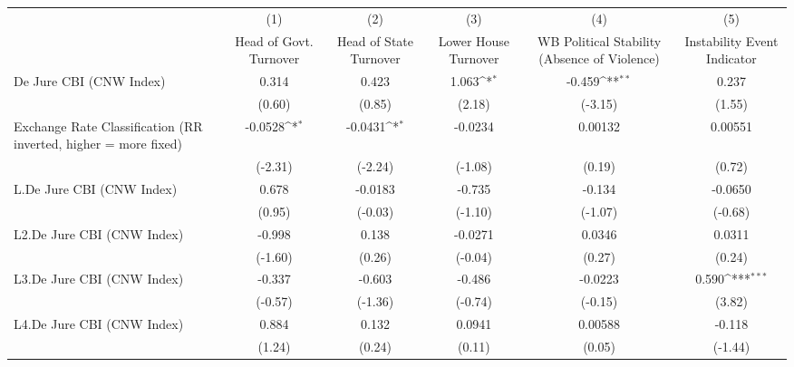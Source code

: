 {
\def\sym#1{\ifmmode^{#1}\else\(^{#1}\)\fi}
\begin{longtable}{l*{5}{c}}
\hline\hline\endfirsthead\hline\endhead\hline\endfoot\endlastfoot
                &\multicolumn{1}{c}{(1)}&\multicolumn{1}{c}{(2)}&\multicolumn{1}{c}{(3)}&\multicolumn{1}{c}{(4)}&\multicolumn{1}{c}{(5)}\\
                &\multicolumn{1}{c}{Head of Govt. Turnover}&\multicolumn{1}{c}{Head of State Turnover}&\multicolumn{1}{c}{Lower House Turnover}&\multicolumn{1}{c}{WB Political Stability (Absence of Violence)}&\multicolumn{1}{c}{Instability Event Indicator}\\
\hline
De Jure CBI (CNW Index)&    0.314         &    0.423         &    1.063\sym{*}  &   -0.459\sym{**} &    0.237         \\
                &   (0.60)         &   (0.85)         &   (2.18)         &  (-3.15)         &   (1.55)         \\
[1em]
Exchange Rate Classification (RR inverted, higher = more fixed)&  -0.0528\sym{*}  &  -0.0431\sym{*}  &  -0.0234         &  0.00132         &  0.00551         \\
                &  (-2.31)         &  (-2.24)         &  (-1.08)         &   (0.19)         &   (0.72)         \\
[1em]
L.De Jure CBI (CNW Index)&    0.678         &  -0.0183         &   -0.735         &   -0.134         &  -0.0650         \\
                &   (0.95)         &  (-0.03)         &  (-1.10)         &  (-1.07)         &  (-0.68)         \\
[1em]
L2.De Jure CBI (CNW Index)&   -0.998         &    0.138         &  -0.0271         &   0.0346         &   0.0311         \\
                &  (-1.60)         &   (0.26)         &  (-0.04)         &   (0.27)         &   (0.24)         \\
[1em]
L3.De Jure CBI (CNW Index)&   -0.337         &   -0.603         &   -0.486         &  -0.0223         &    0.590\sym{***}\\
                &  (-0.57)         &  (-1.36)         &  (-0.74)         &  (-0.15)         &   (3.82)         \\
[1em]
L4.De Jure CBI (CNW Index)&    0.884         &    0.132         &   0.0941         &  0.00588         &   -0.118         \\
                &   (1.24)         &   (0.24)         &   (0.11)         &   (0.05)         &  (-1.44)         \\

\end{longtable}}
